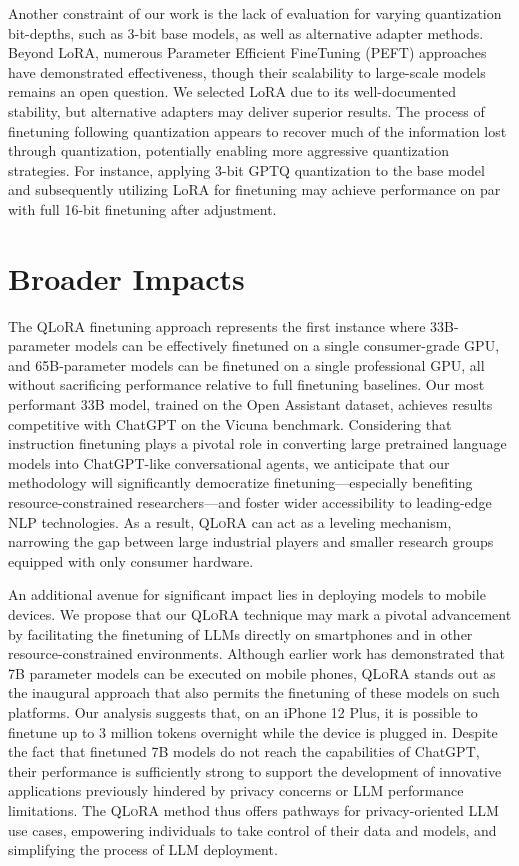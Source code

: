 Another constraint of our work is the lack of evaluation for varying quantization bit-depths, such as 3-bit base models, as well as alternative adapter methods. Beyond LoRA, numerous Parameter Efficient FineTuning (PEFT) approaches have demonstrated effectiveness, though their scalability to large-scale models remains an open question. We selected LoRA due to its well-documented stability, but alternative adapters may deliver superior results. The process of finetuning following quantization appears to recover much of the information lost through quantization, potentially enabling more aggressive quantization strategies. For instance, applying 3-bit GPTQ quantization to the base model and subsequently utilizing LoRA for finetuning may achieve performance on par with full 16-bit finetuning after adjustment.

\section{Broader Impacts}

The \textsc{QLoRA} finetuning approach represents the first instance where 33B-parameter models can be effectively finetuned on a single consumer-grade GPU, and 65B-parameter models can be finetuned on a single professional GPU, all without sacrificing performance relative to full finetuning baselines. Our most performant 33B model, trained on the Open Assistant dataset, achieves results competitive with ChatGPT on the Vicuna benchmark. Considering that instruction finetuning plays a pivotal role in converting large pretrained language models into ChatGPT-like conversational agents, we anticipate that our methodology will significantly democratize finetuning—especially benefiting resource-constrained researchers—and foster wider accessibility to leading-edge NLP technologies. As a result, \textsc{QLoRA} can act as a leveling mechanism, narrowing the gap between large industrial players and smaller research groups equipped with only consumer hardware.

An additional avenue for significant impact lies in deploying models to mobile devices. We propose that our \textsc{QLoRA} technique may mark a pivotal advancement by facilitating the finetuning of LLMs directly on smartphones and in other resource-constrained environments. Although earlier work has demonstrated that 7B parameter models can be executed on mobile phones, \textsc{QLoRA} stands out as the inaugural approach that also permits the finetuning of these models on such platforms. Our analysis suggests that, on an iPhone 12 Plus, it is possible to finetune up to 3 million tokens overnight while the device is plugged in. Despite the fact that finetuned 7B models do not reach the capabilities of ChatGPT, their performance is sufficiently strong to support the development of innovative applications previously hindered by privacy concerns or LLM performance limitations. The \textsc{QLoRA} method thus offers pathways for privacy-oriented LLM use cases, empowering individuals to take control of their data and models, and simplifying the process of LLM deployment.

